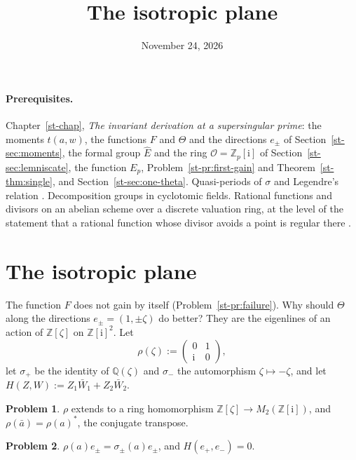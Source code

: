 \documentclass[reqno]{amsart}
\title{The isotropic plane}
\author{}
\date{November 24, 2026}
\newcounter{chap}
\theoremstyle{definition}
\newtheorem{problem}{Problem}[section]
\theoremstyle{plain}
\newcommand{\Z}{\mathbb{Z}}
\newcommand{\Q}{\mathbb{Q}}
\newcommand{\ii}{\mathrm{i}}
\newcommand{\Oc}{\mathcal{O}}
\begin{document}
\maketitle
{}\label{chap}

\paragraph{Prerequisites.}
Chapter~\ref{st-chap}, \emph{The invariant derivation at a supersingular prime}: the moments \(t(a,w)\), the functions \(F\) and \(\Theta\) and the directions \(e_\pm\) of Section~\ref{st-sec:moments}, the formal group \(\hat E\) and the ring \(\Oc = \Z_p[\ii]\) of Section~\ref{st-sec:lemniscate}, the function \(E_p\), Problem~\ref{st-pr:first-gain} and Theorem~\ref{st-thm:single}, and Section~\ref{st-sec:one-theta}.  Quasi-periods of \(\sigma\) and Legendre's relation \cite[\S I.5]{Si2}.  Decomposition groups in cyclotomic fields.  Rational functions and divisors on an abelian scheme over a discrete valuation ring, at the level of the statement that a rational function whose divisor avoids a point is regular there \cite[Lemma~2.13]{BK}.

\section{The isotropic plane}\label{sec:plane}

The function \(F\) does not gain by itself (Problem~\ref{st-pr:failure}).  Why should \(\Theta\) along the directions \(e_\pm = (1, \pm\zeta)\) do better?  They are the eigenlines of an action of \(\Z[\zeta]\) on \(\Z[\ii]^2\).  Let
\[
  \rho(\zeta) := \begin{pmatrix} 0 & 1 \\ \ii & 0 \end{pmatrix},
\]
let \(\sigma_+\) be the identity of \(\Q(\zeta)\) and \(\sigma_-\) the automorphism \(\zeta \mapsto -\zeta\), and let \(H(Z, W) := Z_1 \bar W_1 + Z_2 \bar W_2\).

\begin{problem}\label{pr:rho}
\(\rho\) extends to a ring homomorphism \(\Z[\zeta] \to M_2(\Z[\ii])\), and \(\rho(\bar a) = \rho(a)^*\), the conjugate transpose.
\end{problem}

\begin{problem}\label{pr:eigen}
\(\rho(a) e_\pm = \sigma_\pm(a) e_\pm\), and \(H(e_+, e_-) = 0\).
\end{problem}
\end{document}
